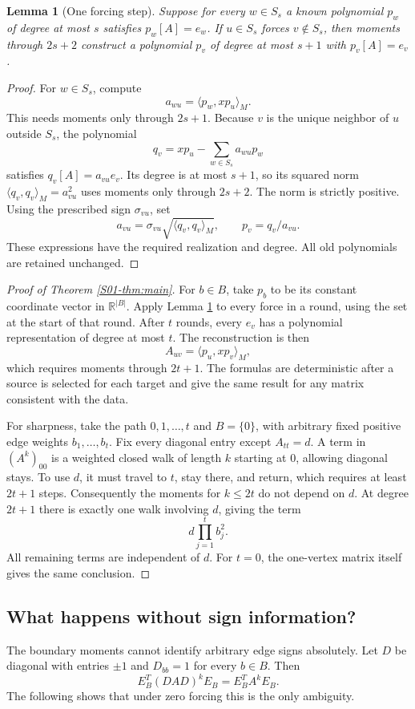 \documentclass[11pt,a4paper]{article}
\newtheorem{lemma}[theorem]{Lemma}
\theoremstyle{definition}\newtheorem{definition}[theorem]{Definition}
\theoremstyle{remark}\newtheorem{remark}[theorem]{Remark}
\newcommand{\R}{\mathbb R}\newcommand{\C}{\mathbb C}\newcommand{\N}{\mathbb N}
\numberwithin{equation}{section}
\begin{document}
\begin{lemma}[One forcing step]\label{S01-lem:step}
Suppose for every $w\in S_s$ a known polynomial $p_w$ of degree at most $s$ satisfies $p_w[A]=e_w$. If $u\in S_s$ forces $v\notin S_s$, then moments through $2s+2$ construct a polynomial $p_v$ of degree at most $s+1$ with $p_v[A]=e_v$.
\end{lemma}
\begin{proof}
For $w\in S_s$, compute
\[
 a_{wu}=\langle p_w,xp_u\rangle_M.
\]
This needs moments only through $2s+1$. Because $v$ is the unique neighbor of $u$ outside $S_s$, the polynomial
\[
 q_v=xp_u-\sum_{w\in S_s}a_{wu}p_w
\]
satisfies $q_v[A]=a_{vu}e_v$. Its degree is at most $s+1$, so its squared norm $\langle q_v,q_v\rangle_M=a_{vu}^2$ uses moments only through $2s+2$. The norm is strictly positive. Using the prescribed sign $\sigma_{vu}$, set
\[
 a_{vu}=\sigma_{vu}\sqrt{\langle q_v,q_v\rangle_M},\qquad
 p_v=q_v/a_{vu}.
\]
These expressions have the required realization and degree. All old polynomials are retained unchanged.
\end{proof}

\begin{proof}[Proof of Theorem \ref{S01-thm:main}]
For $b\in B$, take $p_b$ to be its constant coordinate vector in $\R^{|B|}$. Apply Lemma \ref{S01-lem:step} to every force in a round, using the set at the start of that round. After $t$ rounds, every $e_v$ has a polynomial representation of degree at most $t$. The reconstruction is then
\[
 A_{uv}=\langle p_u,xp_v\rangle_M,
\]
which requires moments through $2t+1$. The formulas are deterministic after a source is selected for each target and give the same result for any matrix consistent with the data.

For sharpness, take the path $0,1,\ldots,t$ and $B=\{0\}$, with arbitrary fixed positive edge weights $b_1,\ldots,b_t$. Fix every diagonal entry except $A_{tt}=d$. A term in $(A^k)_{00}$ is a weighted closed walk of length $k$ starting at $0$, allowing diagonal stays. To use $d$, it must travel to $t$, stay there, and return, which requires at least $2t+1$ steps. Consequently the moments for $k\le2t$ do not depend on $d$. At degree $2t+1$ there is exactly one walk involving $d$, giving the term
\[
 d\prod_{j=1}^{t}b_j^2.
\]
All remaining terms are independent of $d$. For $t=0$, the one-vertex matrix itself gives the same conclusion.
\end{proof}

\subsection{What happens without sign information?}\label{S01-sec-3}
The boundary moments cannot identify arbitrary edge signs absolutely. Let $D$ be diagonal with entries $\pm1$ and $D_{bb}=1$ for every $b\in B$. Then
\[
 E_B^T(DAD)^kE_B=E_B^TA^kE_B.
\]
The following shows that under zero forcing this is the only ambiguity.
\end{document}
